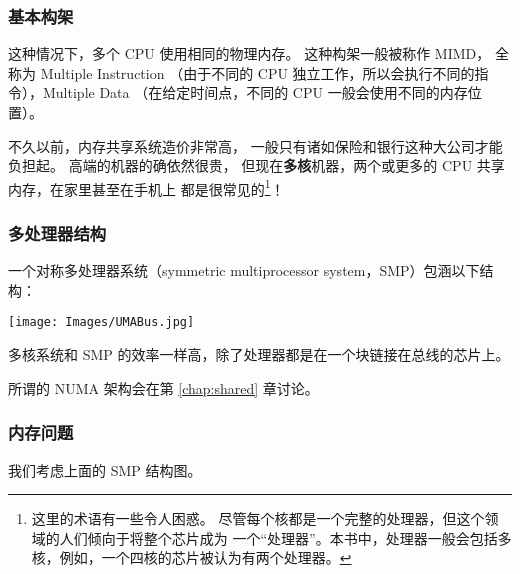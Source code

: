 \subsubsection{基本构架}

这种情况下，多个 CPU 使用相同的物理内存。
这种构架一般被称作 MIMD，
全称为 Multiple Instruction
（由于不同的 CPU 独立工作，所以会执行不同的指令），Multiple Data
（在给定时间点，不同的 CPU 一般会使用不同的内存位置）。

不久以前，内存共享系统造价非常高，
一般只有诸如保险和银行这种大公司才能负担起。
高端的机器的确依然很贵，
但现在{\bf 多核}机器，两个或更多的 CPU 共享内存，在家里甚至在手机上
都是很常见的\footnote{这里的术语有一些令人困惑。
尽管每个核都是一个完整的处理器，但这个领域的人们倾向于将整个芯片成为
一个``处理器''。本书中，处理器一般会包括多核，例如，一个四核的芯片被认为有两个处理器。}！

\subsubsection{多处理器结构}

一个对称多处理器系统（symmetric multiprocessor system，SMP）包涵以下结构：

\texttt{[image: Images/UMABus.jpg]} 

多核系统和 SMP 的效率一样高，除了处理器都是在一个块链接在总线的芯片上。

所谓的 NUMA 架构会在第 \ref{chap:shared} 章讨论。

\subsubsection{内存问题}

我们考虑上面的 SMP 结构图。


